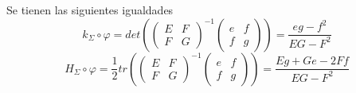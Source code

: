 \documentclass{article}
\begin{document}
\begin{teo}
    Se tienen las siguientes igualdades
    \begin{equation*}
        k_{\Sigma}\circ\varphi=det\left(\begin{pmatrix}
            E & F \\
            F & G
        \end{pmatrix}^{-1}\begin{pmatrix}
            e & f \\
            f & g
        \end{pmatrix}\right)=\frac{eg-f^{2}}{EG-F^{2}}
    \end{equation*}
    \begin{equation*}
        H_{\Sigma}\circ\varphi=\frac{1}{2}tr\left(\begin{pmatrix}
            E & F \\
            F & G
        \end{pmatrix}^{-1}\begin{pmatrix}
            e & f \\
            f & g
        \end{pmatrix}\right)=\frac{Eg+Ge-2Ff}{EG-F^{2}}
    \end{equation*}
\end{teo}
\end{document}
